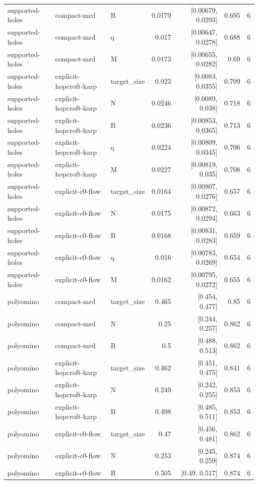 \begin{table}[t]
\begin{tabular}{lllrrrr}
supported-holes & compact-mrd & B & 0.0179 & [0.00679, 0.0293] & 0.695 & 6 \\
supported-holes & compact-mrd & q & 0.017 & [0.00647, 0.0278] & 0.688 & 6 \\
supported-holes & compact-mrd & M & 0.0173 & [0.00655, 0.0282] & 0.69 & 6 \\
supported-holes & explicit-hopcroft-karp & target_size & 0.023 & [0.0083, 0.0355] & 0.709 & 6 \\
supported-holes & explicit-hopcroft-karp & N & 0.0246 & [0.0089, 0.038] & 0.718 & 6 \\
supported-holes & explicit-hopcroft-karp & B & 0.0236 & [0.00853, 0.0365] & 0.713 & 6 \\
supported-holes & explicit-hopcroft-karp & q & 0.0224 & [0.00809, 0.0345] & 0.706 & 6 \\
supported-holes & explicit-hopcroft-karp & M & 0.0227 & [0.00819, 0.035] & 0.708 & 6 \\
supported-holes & explicit-c0-flow & target_size & 0.0164 & [0.00807, 0.0276] & 0.657 & 6 \\
supported-holes & explicit-c0-flow & N & 0.0175 & [0.00872, 0.0294] & 0.663 & 6 \\
supported-holes & explicit-c0-flow & B & 0.0168 & [0.00831, 0.0283] & 0.659 & 6 \\
supported-holes & explicit-c0-flow & q & 0.016 & [0.00783, 0.0269] & 0.654 & 6 \\
supported-holes & explicit-c0-flow & M & 0.0162 & [0.00795, 0.0272] & 0.655 & 6 \\
polyomino & compact-mrd & target_size & 0.465 & [0.454, 0.477] & 0.85 & 6 \\
polyomino & compact-mrd & N & 0.25 & [0.244, 0.257] & 0.862 & 6 \\
polyomino & compact-mrd & B & 0.5 & [0.488, 0.513] & 0.862 & 6 \\
polyomino & explicit-hopcroft-karp & target_size & 0.462 & [0.451, 0.475] & 0.841 & 6 \\
polyomino & explicit-hopcroft-karp & N & 0.249 & [0.242, 0.255] & 0.853 & 6 \\
polyomino & explicit-hopcroft-karp & B & 0.498 & [0.485, 0.511] & 0.853 & 6 \\
polyomino & explicit-c0-flow & target_size & 0.47 & [0.456, 0.481] & 0.862 & 6 \\
polyomino & explicit-c0-flow & N & 0.253 & [0.245, 0.259] & 0.874 & 6 \\
polyomino & explicit-c0-flow & B & 0.505 & [0.49, 0.517] & 0.874 & 6 \\

\end{tabular}
\end{table}
